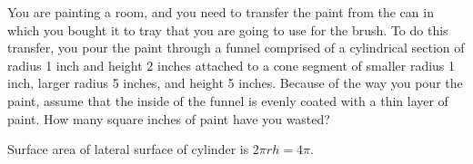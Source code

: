 \documentclass[12pt]{exam}
\begin{document}
\begin{questions}
    \clearpage
\question  You are painting a room, and you need to transfer the paint from the can in which you bought it to tray that you are going to use for the brush. To do this transfer, you pour the paint through a funnel comprised of a cylindrical section of radius 1 inch and height 2 inches attached to a cone segment of smaller radius 1 inch, larger radius 5 inches, and height 5 inches. Because of the way you pour the paint, assume that the inside of the funnel is evenly coated with a thin layer of paint. How many square inches of paint have you wasted?
    \begin{solution}
        Surface area of lateral surface of cylinder is $2\pi r h = 4 \pi$.

\end{solution}
\end{questions}
\end{document}
